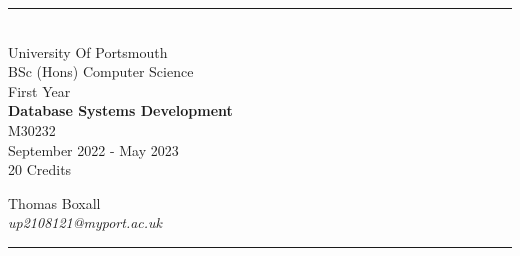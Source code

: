 \documentclass[a4paper, 11pt]{report}
\begin{document}
\begin{titlepage}
    \rule{\textwidth}{1px}
    \vspace{0.025\textheight}\\
    \huge{University Of Portsmouth}\\
    \huge{BSc (Hons) Computer Science}\\
    \huge{First Year}\\
    \vfill
    \LARGE{\textbf{Database Systems Development}}\\
    \Large{M30232}\\
    \large{September 2022 - May 2023}\\
    \large{20 Credits}
    \vfill

    
    \begin{FlushRight}
        \large{Thomas Boxall}\\
        \textit{up2108121@myport.ac.uk}\\
        
    \end{FlushRight}
    \vspace{0.2\textheight}
    \rule{\textwidth}{1px}
    
\end{titlepage}

\tableofcontents





\end{document}
